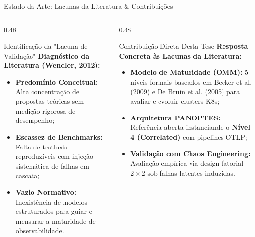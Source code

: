 \documentclass[aspectratio=169, 10pt]{beamer}
\begin{document}
\begin{frame}{Estado da Arte: Lacunas da Literatura \& Contribuições}
  \begin{columns}[T]
    \begin{column}{0.48\textwidth}
      \begin{alertblock}{Identificação da "Lacuna de Validação"}
        \small
        \textbf{Diagnóstico da Literatura (Wendler, 2012):}
        \begin{itemize}
          \item \textbf{Predomínio Conceitual:} Alta concentração de propostas teóricas sem medição rigorosa de desempenho;
          \item \textbf{Escassez de Benchmarks:} Falta de testbeds reproduzíveis com injeção sistemática de falhas em cascata;
          \item \textbf{Vazio Normativo:} Inexistência de modelos estruturados para guiar e mensurar a maturidade de observabilidade.
        \end{itemize}
      \end{alertblock}
    \end{column}
    
    \begin{column}{0.48\textwidth}
      \begin{exampleblock}{Contribuição Direta Desta Tese}
        \small
        \textbf{Resposta Concreta às Lacunas da Literatura:}
        \begin{itemize}
          \item \textbf{Modelo de Maturidade (OMM):} 5 níveis formais baseados em Becker et al. (2009) e De Bruin et al. (2005) para avaliar e evoluir clusters K8s;
          \item \textbf{Arquitetura PANOPTES:} Referência aberta instanciando o \textbf{Nível 4 (Correlated)} com pipelines OTLP;
          \item \textbf{Validação com Chaos Engineering:} Avaliação empírica via design fatorial $2\times2$ sob falhas latentes induzidas.
        \end{itemize}
      \end{exampleblock}
    \end{column}
  \end{columns}
\end{frame}
\end{document}
